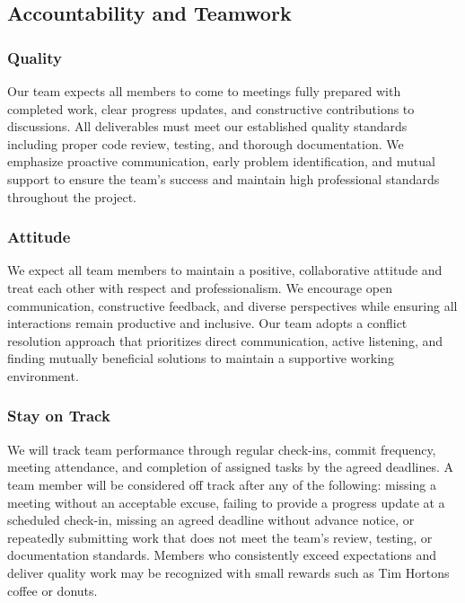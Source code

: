 \documentclass{article}
\begin{document}
\subsection*{Accountability and Teamwork}

\subsubsection*{Quality} 

Our team expects all members to come to meetings fully prepared with completed
work, clear progress updates, and constructive contributions to discussions. All
deliverables must meet our established quality standards including proper code
review, testing, and thorough documentation. We emphasize proactive
communication, early problem identification, and mutual support to ensure the
team's success and maintain high professional standards throughout the project.

\subsubsection*{Attitude}

We expect all team members to maintain a positive, collaborative attitude and
treat each other with respect and professionalism. We encourage open
communication, constructive feedback, and diverse perspectives while ensuring
all interactions remain productive and inclusive. Our team adopts a conflict
resolution approach that prioritizes direct communication, active listening, and
finding mutually beneficial solutions to maintain a supportive working
environment.

\subsubsection*{Stay on Track} \label{sec:SOT}

We will track team performance through regular check-ins, commit frequency,
meeting attendance, and completion of assigned tasks by the agreed deadlines.
A team member will be considered off track after any of the following: missing
a meeting without an acceptable excuse, failing to provide a progress update at
a scheduled check-in, missing an agreed deadline without advance notice, or
repeatedly submitting work that does not meet the team's review, testing, or
documentation standards. Members who consistently exceed expectations and
deliver quality work may be recognized with small rewards such as Tim Hortons
coffee or donuts.
\end{document}
